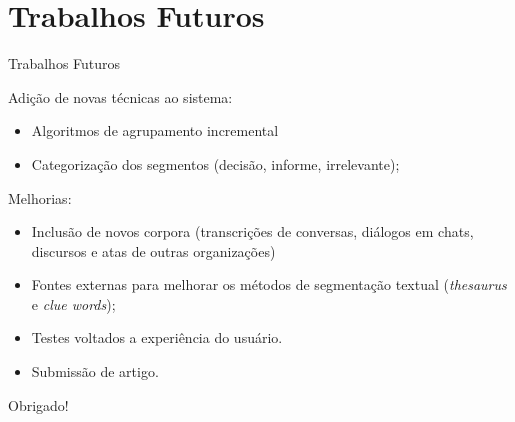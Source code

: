\documentclass[xcolor=table]{beamer}
\begin{document}
\section{Trabalhos Futuros}
\begin{frame}{Trabalhos Futuros}
	
	\nblock{} {

		Adição de novas técnicas ao sistema:
	\begin{itemize}
		\item Algoritmos de agrupamento incremental
			\item Categorização dos segmentos (decisão, informe, irrelevante);
	\end{itemize}
}
	
	\nblock{} {
		Melhorias:
	\begin{itemize}
		\item Inclusão de novos corpora (transcrições de conversas, diálogos em chats, discursos e atas de outras organizações)
		\item Fontes externas para melhorar os métodos de segmentação textual  (\textit{thesaurus} e \textit{clue words});
		\item Testes voltados a experiência do usuário.

	\end{itemize}
	
	}
	
	\eblock{} {
		\begin{itemize}
			\item Submissão de artigo.
		\end{itemize}
	}
\end{frame}



\begin{frame}{}

\center\LARGE Obrigado!

\end{frame}
\end{document}
